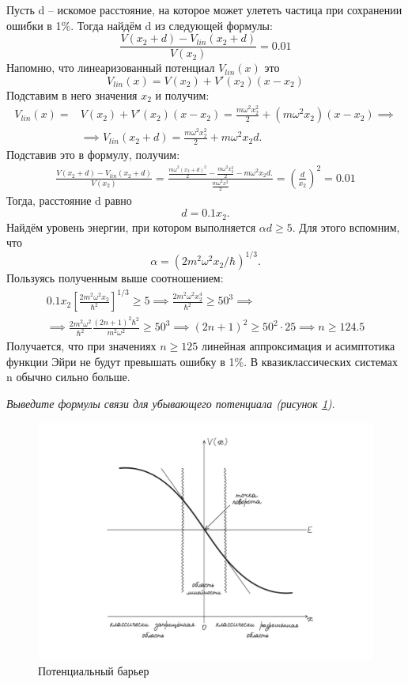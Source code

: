 Пусть d -- искомое расстояние, на которое может улететь частица при сохранении ошибки в 1\%. Тогда найдём d из следующей формулы:
\[
\frac{V(x_2 + d) - V_{lin}(x_2 + d)}{V(x_2)} = 0.01
\]
Напомню, что линеаризованный потенциал $V_{lin}(x)$ это
\[
V_{lin}(x) = V(x_2)  + V'(x_2)(x - x_2)
\]
Подставим в него значения $x_2$ и получим:
\begin{align*}
V_{lin}(x) = & V(x_2)  + V'(x_2)(x - x_2) = \frac{m\omega^2 x_2^2}{2} + (m\omega^2 x_2)(x-x_2)\implies \\
&\implies V_{lin}(x_2 + d) = \frac{m\omega^2 x_2^2}{2} + m\omega^2 x_2d.
\end{align*}
Подставив это в формулу, получим:
\begin{gather*}
    \frac{V(x_2 + d) - V_{lin}(x_2 + d)}{V(x_2)} = \frac{\frac{m\omega^2 (x_2 + d)^2}{2} - \frac{m\omega^2 x_2^2}{2} - m\omega^2 x_2d.}{\frac{m\omega^2 x^2}{2}} = \left(\frac{d}{x_2}\right)^2 =  0.01
\end{gather*}
Тогда, расстояние d равно
\[
d = 0.1x_2.
\]
Найдём уровень энергии, при котором выполняется $\alpha d \geq 5$. Для этого вспомним, что 
\[
\alpha = (2m^2\omega^2x_2/\hbar)^{1/3}.
\]
Пользуясь полученным выше соотношением:
\begin{gather*}
    0.1x_2\left[\frac{2m^2\omega^2x_2}{\hbar^2}\right]^{1/3} \geq 5 \implies \frac{2m^2\omega^2 x_2^4}{\hbar^2} \geq 50^3 \implies \\
   \implies \frac{2m^2\omega^2}{\hbar^2} \frac{(2n + 1)^2\hbar^2}{m^2\omega^2} \geq 50^3 \implies (2n+1)^2 \geq 50^2 \cdot 25 \implies n \geq 124.5
\end{gather*}
Получается, что при значениях $n\geq 125$ линейная аппроксимация и асимптотика функции Эйри не будут превышать ошибку в 1\%. В квазиклассических системах n обычно сильно больше.

\begin{center}
\textit{Выведите формулы связи для убывающего потенциала (рисунок \ref{fig C.1})}.
\end{center}
\begin{figure}[ht]
\centering
\includegraphics[scale=0.21]{appendix/images/left-turning-point.jpg}
\caption{Потенциальный барьер}
\label{fig C.1}
\end{figure}


